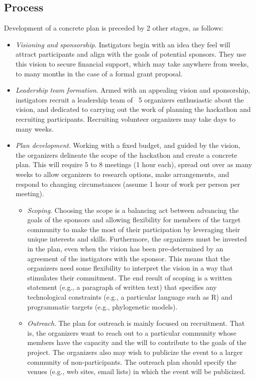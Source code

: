 \documentclass[11pt]{article}
\begin{document}
\subsection{Process}
Development of a concrete plan is preceded by 2 other stages, as follows: 
\begin{itemize}
\item	{\em Visioning and sponsorship}. Instigators begin with an idea they feel will attract participants and align with the goals of potential sponsors. They use this vision to secure financial support, which may take anywhere from weeks, to many months in the case of a formal grant proposal. 
\item	{\em Leadership team formation}. Armed with an appealing vision and sponsorship, instigators recruit a leadership team of ~5 organizers enthusiastic about the vision, and dedicated to carrying out the work of planning the hackathon and recruiting participants. Recruiting volunteer organizers may take days to many weeks. 
\item	{\em Plan development}. Working with a fixed budget, and guided by the vision, the organizers delineate the scope of the hackathon and create a concrete plan. This will require 5 to 8 meetings (1 hour each), spread out over as many weeks to allow organizers to research options, make arrangements, and respond to changing circumstances (assume 1 hour of work per person per meeting). 
\begin{itemize}
\item	{\em Scoping}. Choosing the scope is a balancing act between advancing the goals of the sponsors and allowing flexibility for members of the target community to make the most of their participation by leveraging their unique interests and skills. Furthermore, the organizers must be invested in the plan, even when the vision has been pre-determined by an agreement of the instigators with the sponsor. This means that the organizers need some flexibility to interpret the vision in a way that stimulates their commitment.  The end result of scoping is a written statement (e.g., a paragraph of written text) that specifies any technological constraints (e.g., a particular language such as R) and programmatic targets (e.g., phylogenetic models).  
\item	{\em Outreach}. The plan for outreach is mainly focused on recruitment. That is, the organizers want to reach out to a particular community whose members have the capacity and the will to contribute to the goals of the project. The organizers also may wish to publicize the event to a larger community of non-participants. The outreach plan should specify the venues (e.g., web sites, email lists) in which the event will be publicized. 

\end{itemize}
\end{itemize}
\end{document}
